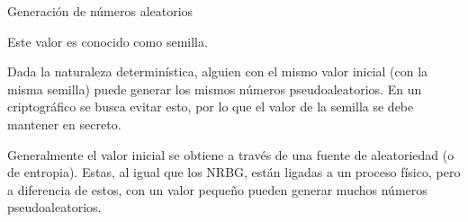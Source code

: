 \begin{frame}{Generación de números aleatorios}
\begin{itemize}
    {
      Este valor es conocido como semilla.
    }

    {
      Dada la naturaleza determinística, alguien con el mismo valor inicial (con
      la misma semilla) puede generar los mismos números pseudoaleatorios. En un
      criptográfico se busca evitar esto, por lo que el valor de la semilla se
      debe mantener en secreto.

      Generalmente el valor inicial se obtiene a través de una fuente de
      aleatoriedad (o de entropia). Estas, al igual que los NRBG, están ligadas
      a un proceso físico, pero a diferencia de estos, con un valor pequeño
      pueden generar muchos números pseudoaleatorios.
    }

  \end{itemize}

\end{frame}

